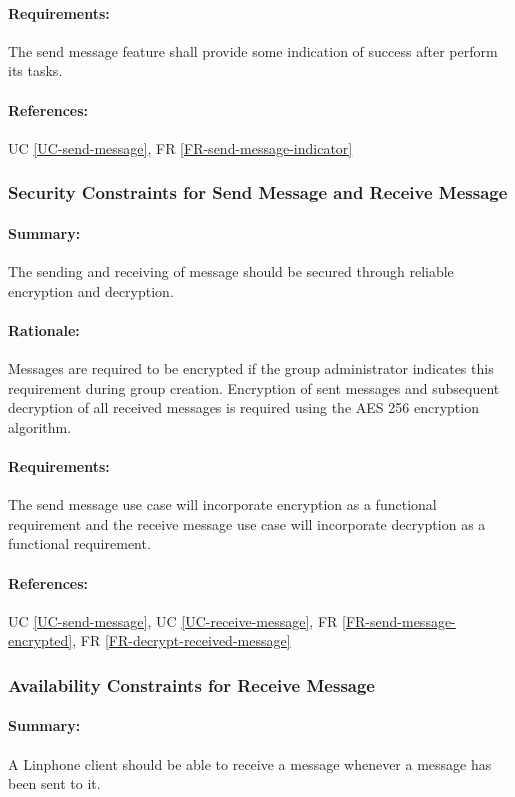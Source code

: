 \documentclass[11pt]{article}
\begin{document}
\paragraph{Requirements:} The send message feature shall provide some indication of success after perform its tasks.
\paragraph{References:} UC \ref{UC-send-message}, FR \ref{FR-send-message-indicator}

\subsubsection{Security Constraints for Send Message and Receive Message} \label{NFR-security-send-message-and-receive-message}
\paragraph{Summary:} The sending and receiving of message should be secured through reliable encryption and decryption.
\paragraph{Rationale:} Messages are required to be encrypted if the group administrator indicates this requirement during group creation. Encryption of sent messages and subsequent decryption of all received messages is required using the AES 256 encryption algorithm. 
\paragraph{Requirements:} The send message use case will incorporate encryption as a functional requirement and the receive message use case will incorporate decryption as a functional requirement.
\paragraph{References:} UC \ref{UC-send-message}, UC \ref{UC-receive-message}, FR \ref{FR-send-message-encrypted}, FR \ref{FR-decrypt-received-message}

\subsubsection{Availability Constraints for Receive Message} \label{NFR-availability-receive-message}
\paragraph{Summary:} A Linphone client should be able to receive a message whenever a message has been sent to it.
\end{document}
